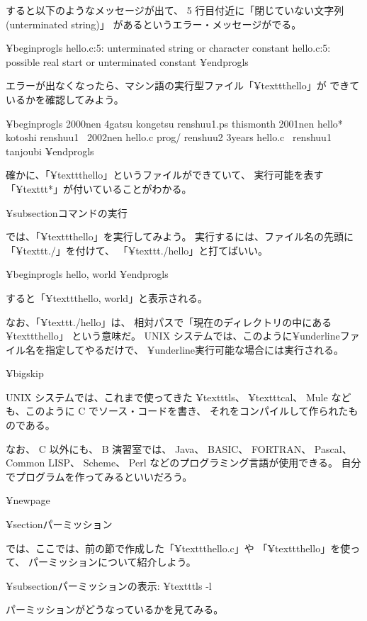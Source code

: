 すると以下のようなメッセージが出て、
 5 行目付近に「閉じていない文字列(unterminated string)」
があるというエラー・メッセージがでる。 

¥begin{progls}
hello.c:5: unterminated string or character constant
hello.c:5: possible real start or unterminated constant
%
¥end{progls}


エラーが出なくなったら、マシン語の実行型ファイル「¥texttt{hello}」が
できているかを確認してみよう。

¥begin{progls}
2000nen         4gatsu          kongetsu        renshuu1.ps     thismonth
2001nen         hello*          kotoshi         renshuu1~
2002nen         hello.c         prog/           renshuu2
3years          hello.c~        renshuu1        tanjoubi
%
¥end{progls}

確かに、「¥texttt{hello}」というファイルができていて、
実行可能を表す「¥texttt{*}」が付いていることがわかる。

¥subsection{コマンドの実行}

では、「¥texttt{hello}」を実行してみよう。
実行するには、ファイル名の先頭に「¥texttt{./}」を付けて、
「¥texttt{./hello}」と打てばいい。

¥begin{progls}
hello, world
%
¥end{progls}

すると「¥texttt{hello, world}」と表示される。

なお、「¥texttt{./hello}」は、
相対パスで「現在のディレクトリの中にある¥texttt{hello}」
という意味だ。
UNIX システムでは、このように¥underline{ファイル名を指定してやるだけ}で、
¥underline{実行可能な場合には実行}される。

¥bigskip

UNIX システムでは、これまで使ってきた ¥texttt{ls}、 ¥texttt{cal}、
 Mule なども、このように C でソース・コードを書き、
それをコンパイルして作られたものである。

なお、 C 以外にも、 B 演習室では、 Java、 BASIC、 FORTRAN、
Pascal、 Common LISP、 Scheme、 Perl などのプログラミング言語が使用できる。
自分でプログラムを作ってみるといいだろう。

¥newpage

¥section{パーミッション}

では、ここでは、前の節で作成した「¥texttt{hello.c}」や
「¥texttt{hello}」を使って、
パーミッションについて紹介しよう。

¥subsection{パーミッションの表示: ¥texttt{ls -l}}

パーミッションがどうなっているかを見てみる。

